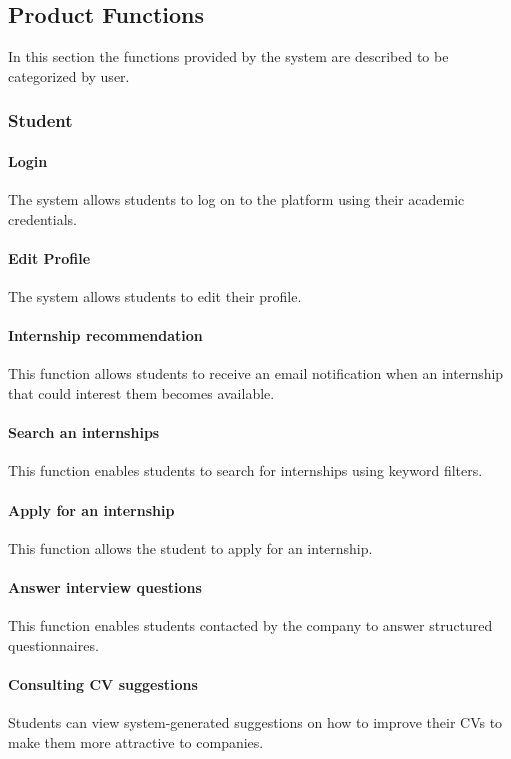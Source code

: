 \subsection{Product Functions}
In this section the functions provided by the system are described to be categorized by user.
\subsubsection{Student}
    \paragraph{Login\\}
    The system allows students to log on to the platform using their academic credentials.
    \paragraph{Edit Profile\\}
    The system allows students to edit their profile.
    \paragraph{Internship recommendation\\}
    This function allows students to receive an email notification when an internship that could interest them becomes available.
    \paragraph{Search an internships\\}
    This function enables students to search for internships using keyword filters.
    \paragraph{Apply for an internship\\}
    This function allows the student to apply for an internship.
    \paragraph{Answer interview questions\\}
    This function enables students contacted by the company to answer structured questionnaires.
    \paragraph{Consulting CV suggestions\\}
    Students can view system-generated suggestions on how to improve their CVs to make them more attractive to companies.
